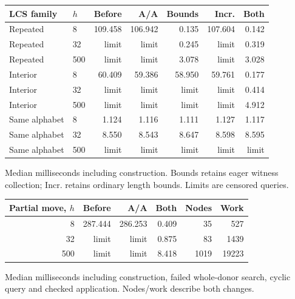 \begin{center}\footnotesize
\begin{tabular}{@{}llrrrrr@{}}
\toprule
LCS family & $h$ & Before & A/A & Bounds & Incr. & Both \\
\midrule
Repeated & 8 & 109.458 & 106.942 & 0.135 & 107.604 & 0.142 \\
Repeated & 32 & limit & limit & 0.245 & limit & 0.319 \\
Repeated & 500 & limit & limit & 3.078 & limit & 3.028 \\
Interior & 8 & 60.409 & 59.386 & 58.950 & 59.761 & 0.177 \\
Interior & 32 & limit & limit & limit & limit & 0.414 \\
Interior & 500 & limit & limit & limit & limit & 4.912 \\
Same alphabet & 8 & 1.124 & 1.116 & 1.111 & 1.127 & 1.117 \\
Same alphabet & 32 & 8.550 & 8.543 & 8.647 & 8.598 & 8.595 \\
Same alphabet & 500 & limit & limit & limit & limit & limit \\
\bottomrule
\end{tabular}
\end{center}
Median milliseconds including construction. Bounds retains eager witness collection; Incr. retains ordinary length bounds. Limits are censored queries.
\begin{center}\small
\begin{tabular}{@{}rrrrrr@{}}
\toprule
Partial move, $h$ & Before & A/A & Both & Nodes & Work \\
\midrule
8 & 287.444 & 286.253 & 0.409 & 35 & 527 \\
32 & limit & limit & 0.875 & 83 & 1439 \\
500 & limit & limit & 8.418 & 1019 & 19223 \\
\bottomrule
\end{tabular}
\end{center}
Median milliseconds including construction, failed whole-donor search, cyclic query and checked application. Nodes/work describe both changes.
